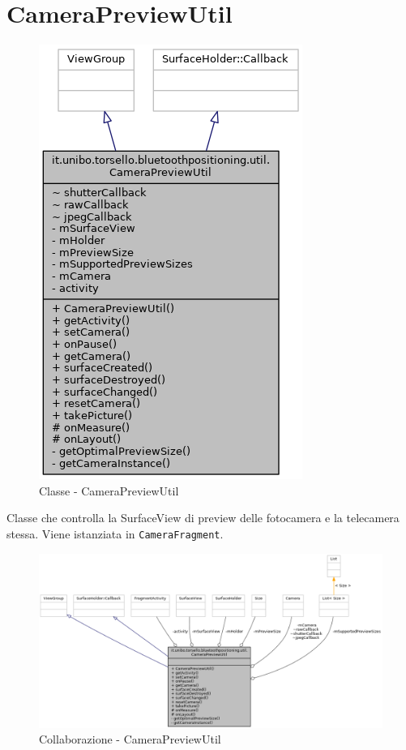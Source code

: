 \newpage
\section{CameraPreviewUtil}
\begin{figure}[ph]
	\centering
	\includegraphics[width=0.5\linewidth]{img/uml/class/classit_1_1unibo_1_1torsello_1_1bluetoothpositioning_1_1util_1_1CameraPreviewUtil__inherit__graph.png}
	\caption{Classe - CameraPreviewUtil}
\end{figure}

Classe che controlla la SurfaceView di preview delle fotocamera e la telecamera stessa. Viene istanziata in \texttt{CameraFragment}.

\begin{figure}[ph]
	\centering
	\includegraphics[width=1.5\linewidth,angle=90]{img/uml/class/classit_1_1unibo_1_1torsello_1_1bluetoothpositioning_1_1util_1_1CameraPreviewUtil__coll__graph.png}
	\caption{Collaborazione - CameraPreviewUtil}
\end{figure}

